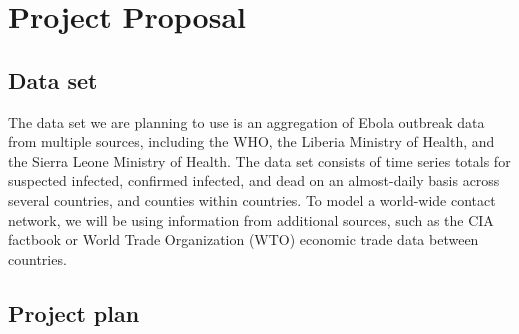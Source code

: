 \documentclass[10pt, journal,onecolumn]{IEEEtran}
\begin{document}
\bigskip


\section{Project Proposal}
\label{sec:ProjectProposal}
\bigskip

\subsection{Data set}

The data set we are planning to use \citep{cmriversdata} is an aggregation of Ebola outbreak data
from multiple sources, including the WHO, the Liberia Ministry of Health, and the Sierra Leone
Ministry of Health. The data set consists of time series totals for suspected infected, confirmed
infected, and dead on an almost-daily basis across several countries, and counties within countries.
To model a world-wide contact network, we will be using information from additional sources, such
as the CIA factbook or World Trade Organization (WTO) economic trade data between countries.



\subsection{Project plan}

\bigskip
\end{document}
